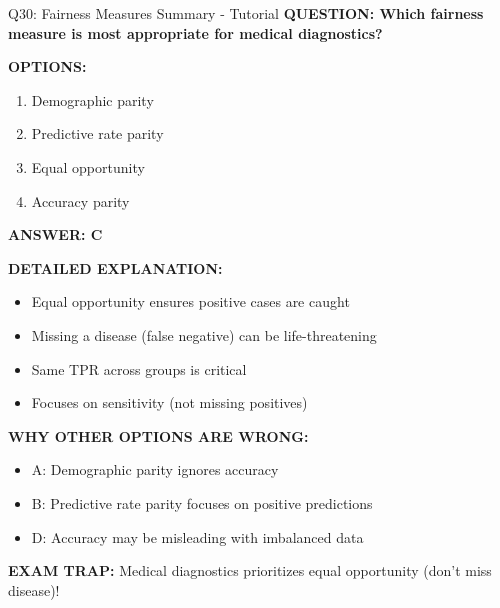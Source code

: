 \documentclass[8pt]{beamer}
\begin{document}
	\begin{frame}{Q30: Fairness Measures Summary - Tutorial}
		\fontsize{6.5}{7.5}\selectfont
		\textbf{QUESTION: Which fairness measure is most appropriate for medical diagnostics?}
		
		\vspace{0.1cm}
		\textbf{OPTIONS:}
		\begin{enumerate}
			\item Demographic parity
			\item Predictive rate parity
			\item Equal opportunity
			\item Accuracy parity
		\end{enumerate}
		
		\vspace{0.1cm}
		\textcolor{myblue}{\textbf{ANSWER: C}}
		
		\vspace{0.1cm}
		\textbf{DETAILED EXPLANATION:}
		\begin{itemize}
			\item Equal opportunity ensures positive cases are caught
			\item Missing a disease (false negative) can be life-threatening
			\item Same TPR across groups is critical
			\item Focuses on sensitivity (not missing positives)
		\end{itemize}
		
		\vspace{0.1cm}
		\textcolor{myred}{\textbf{WHY OTHER OPTIONS ARE WRONG:}}
		\begin{itemize}
			\item \textcolor{myred}{A:} Demographic parity ignores accuracy
			\item \textcolor{myred}{B:} Predictive rate parity focuses on positive predictions
			\item \textcolor{myred}{D:} Accuracy may be misleading with imbalanced data
		\end{itemize}
		
		\textcolor{myred}{\textbf{EXAM TRAP:}} Medical diagnostics prioritizes \textcolor{myblue}{equal opportunity} (don't miss disease)!
	\end{frame}
	
	
\end{document}
